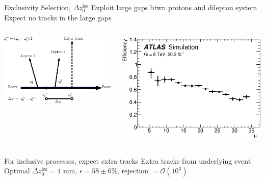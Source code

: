 \documentclass[10pt]{beamer}
\newcommand*{\DZ}{\ensuremath{\Delta z_0^{\mathrm{iso}}}}
\begin{document}
\begin{frame}{Exclusivity Selection, \DZ}
\centering
{\large\color{blue} Exploit large gaps btwn protons and dilepton system}\\
{\large\color{red} Expect no tracks in the large gaps}
\begin{columns}
	\begin{column}{0.5\linewidth}
   \includegraphics[width=\textwidth]{figures/cartoon.eps}
	\end{column}
	\begin{column}{0.5\linewidth}
 \includegraphics[width=\linewidth]{figures/muFit.eps} 
	\end{column}
\end{columns}
\begin{outline}
\1 For inclusive processes, expect extra tracks 
	\2 Extra tracks from underlying event 
\1 Optimal $\DZ=1$ mm,  $\epsilon = 58\pm 6\%$, rejection $=\mathcal{O}(10^3)$
\end{outline}
\end{frame}
\end{document}
